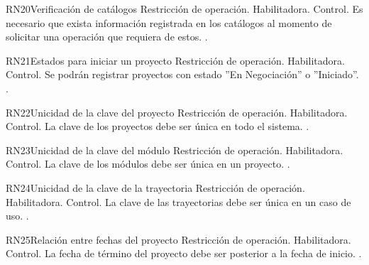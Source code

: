 \begin{BussinesRule}{RN20}{Verificación de catálogos} 
	\BRitem[Tipo:] Restricción de operación. 
	\BRitem[Clase:] Habilitadora. 
	\BRitem[Nivel:] Control. %
	\BRitem[Descripción:] Es necesario que exista información registrada en los catálogos al momento de solicitar una operación que requiera de estos.
	 \UCref{}{}. 
\end{BussinesRule}


\begin{BussinesRule}{RN21}{Estados para iniciar un proyecto} 
	\BRitem[Tipo:] Restricción de operación. 
	\BRitem[Clase:] Habilitadora. 
	\BRitem[Nivel:] Control. %
	\BRitem[Descripción:] Se podrán registrar proyectos con estado ''En Negociación'' o ''Iniciado''.
	 \UCref{}{}. 
\end{BussinesRule}

\begin{BussinesRule}{RN22}{Unicidad de la clave del proyecto} 
	\BRitem[Tipo:] Restricción de operación. 
	\BRitem[Clase:] Habilitadora. 
	\BRitem[Nivel:] Control. %
	\BRitem[Descripción:] La clave de los proyectos debe ser única en todo el sistema.
	 \UCref{}{}. 
\end{BussinesRule}

\begin{BussinesRule}{RN23}{Unicidad de la clave del módulo} 
	\BRitem[Tipo:] Restricción de operación. 
	\BRitem[Clase:] Habilitadora. 
	\BRitem[Nivel:] Control. %
	\BRitem[Descripción:] La clave de los módulos debe ser única en un proyecto.
	 \UCref{}{}. 
\end{BussinesRule}

\begin{BussinesRule}{RN24}{Unicidad de la clave de la trayectoria} 
	\BRitem[Tipo:] Restricción de operación. 
	\BRitem[Clase:] Habilitadora. 
	\BRitem[Nivel:] Control. %
	\BRitem[Descripción:] La clave de las trayectorias debe ser única en un caso de uso.
	 \UCref{}{}. 
\end{BussinesRule}

\begin{BussinesRule}{RN25}{Relación entre fechas del proyecto} 
	\BRitem[Tipo:] Restricción de operación. 
	\BRitem[Clase:] Habilitadora. 
	\BRitem[Nivel:] Control. %
	\BRitem[Descripción:] La fecha de término del proyecto debe ser posterior a la fecha de inicio.
	 \UCref{}{}. 
\end{BussinesRule}

